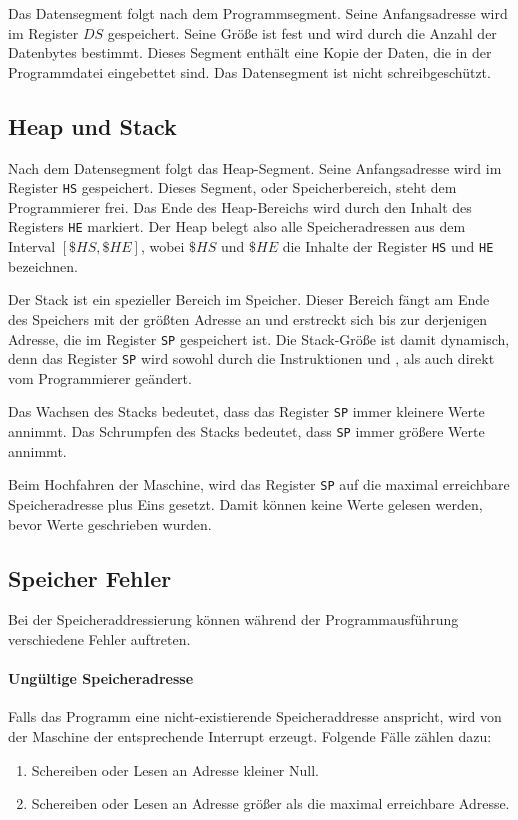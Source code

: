 Das Datensegment folgt nach dem Programmsegment. Seine
Anfangsadresse wird im Register $DS$ gespeichert. Seine
Größe ist fest und wird durch die Anzahl der Datenbytes bestimmt. Dieses Segment
enthält eine Kopie der Daten, die in der Programmdatei eingebettet sind.
Das Datensegment ist nicht schreibgeschützt.

\subsection{Heap und Stack}
\label{subsec:Stack}

Nach dem Datensegment folgt das Heap-Segment. Seine Anfangsadresse
wird im Register \texttt{HS} gespeichert. Dieses Segment,
oder Speicherbereich, steht dem Programmierer frei. Das Ende des Heap-Bereichs
wird durch den Inhalt des Registers \texttt{HE} markiert.
Der Heap belegt also alle Speicheradressen aus dem Interval $[\$HS, \$HE]$,
wobei $\$HS$ und $\$HE$ die Inhalte der Register \texttt{HS} und \texttt{HE}
bezeichnen.


Der Stack ist ein spezieller Bereich im Speicher. Dieser Bereich fängt am Ende
des Speichers mit der größten Adresse an und erstreckt sich bis zur derjenigen
Adresse, die im Register \texttt{SP} gespeichert ist. Die
Stack-Größe ist damit dynamisch, denn das Register \texttt{SP} wird sowohl durch
die Instruktionen  und , als auch direkt vom
Programmierer geändert.

Das Wachsen des Stacks bedeutet, dass das Register
\texttt{SP} immer kleinere Werte annimmt. Das Schrumpfen
des Stacks bedeutet, dass \texttt{SP} immer größere Werte annimmt.

Beim Hochfahren der Maschine, wird das Register \texttt{SP} auf die
maximal erreichbare Speicheradresse plus Eins gesetzt. Damit können keine Werte
gelesen werden, bevor Werte geschrieben wurden.



\subsection{Speicher Fehler}
\label{subsec:Speicherfehler}

Bei der Speicheraddressierung können während der Programmausführung
verschiedene Fehler auftreten.

\paragraph{Ungültige Speicheradresse}
Falls das Programm eine nicht-existierende Speicheraddresse anspricht, wird von
der Maschine der entsprechende Interrupt erzeugt. Folgende Fälle zählen dazu:
\begin{enumerate}
 \item Schereiben oder Lesen an Adresse kleiner Null.
 \item Schereiben oder Lesen an Adresse größer als die maximal erreichbare
       Adresse.
\end{enumerate}



